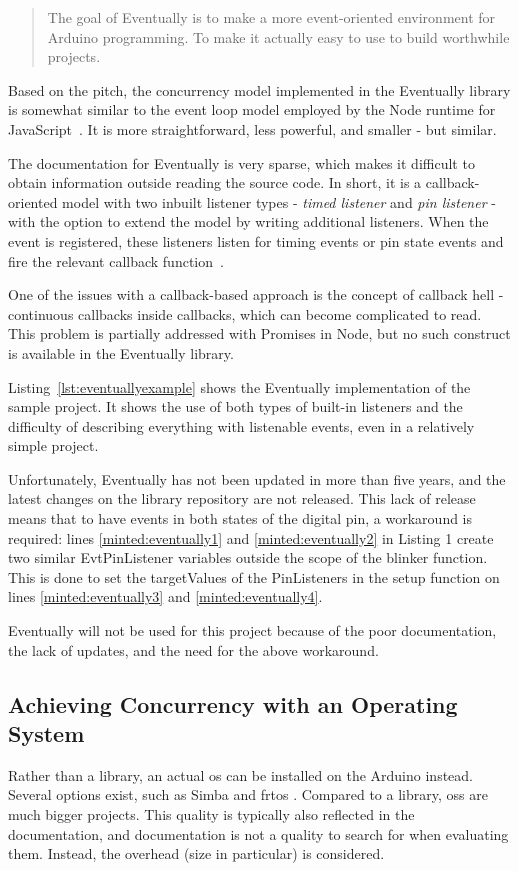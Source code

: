 \blockcquote{bartlettEventually2022Bartlett}{The goal of Eventually is to make a more event-oriented environment for Arduino programming. To make it actually easy to use to build worthwhile projects.}

Based on the pitch, the concurrency model implemented in the Eventually library is somewhat similar to the event loop model employed by the Node runtime for JavaScript~\cite{NodeJSdocs}. It is more straightforward, less powerful, and smaller - but similar.

The documentation for Eventually is very sparse, which makes it difficult to obtain information outside reading the source code. In short, it is a callback-oriented model with two inbuilt listener types - \textit{timed listener} and \textit{pin listener} - with the option to extend the model by writing additional listeners. When the event is registered, these listeners listen for timing events or pin state events and fire the relevant callback function~\cite{bartlettEventually2022Bartlett}.

One of the issues with a callback-based approach is the concept of callback hell - continuous callbacks inside callbacks, which can become complicated to read. This problem is partially addressed with Promises in Node, but no such construct is available in the Eventually library.

Listing~\ref{lst:eventuallyexample} shows the Eventually implementation of the sample project. It shows the use of both types of built-in listeners and the difficulty of describing everything with listenable events, even in a relatively simple project.

Unfortunately, Eventually has not been updated in more than five years, and the latest changes on the library repository are not released. This lack of release means that to have events in both states of the digital pin, a workaround is required: lines \ref{minted:eventually1} and \ref{minted:eventually2} in Listing 1 create two similar EvtPinListener variables outside the scope of the blinker function. This is done to set the targetValues of the PinListeners in the setup function on lines \ref{minted:eventually3} and \ref{minted:eventually4}.

Eventually will not be used for this project because of the poor documentation, the lack of updates, and the need for the above workaround.


\subsection{Achieving Concurrency with an Operating System}\label{subsec:arduinoos}
Rather than a library, an actual \gls{os} can be installed on the Arduino instead. Several options exist, such as Simba \cite{SimbaOS} and \gls{frtos} \cite{AboutRTOS}. Compared to a library, \glspl{os} are much bigger projects. This quality is typically also reflected in the documentation, and documentation is not a quality to search for when evaluating them. Instead, the overhead (size in particular) is considered.


